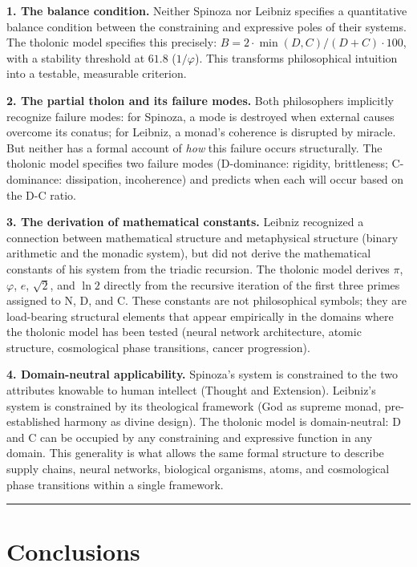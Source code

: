 \documentclass[12pt]{article}
\begin{document}
\textbf{1. The balance condition.} Neither Spinoza nor Leibniz specifies
a quantitative balance condition between the constraining and expressive
poles of their systems. The tholonic model specifies this precisely:
\(B = 2 \cdot \min(D,C)/(D+C) \cdot 100\), with a stability threshold at
\(61.8\) (\(1/\varphi\)). This transforms philosophical intuition into a
testable, measurable criterion.

\textbf{2. The partial tholon and its failure modes.} Both philosophers
implicitly recognize failure modes: for Spinoza, a mode is destroyed
when external causes overcome its conatus; for Leibniz, a monad's
coherence is disrupted by miracle. But neither has a formal account of
\emph{how} this failure occurs structurally. The tholonic model
specifies two failure modes (D-dominance: rigidity, brittleness;
C-dominance: dissipation, incoherence) and predicts when each will occur
based on the D-C ratio.

\textbf{3. The derivation of mathematical constants.} Leibniz recognized
a connection between mathematical structure and metaphysical structure
(binary arithmetic and the monadic system), but did not derive the
mathematical constants of his system from the triadic recursion. The
tholonic model derives \(\pi\), \(\varphi\), \(e\), \(\sqrt{2}\), and
\(\ln 2\) directly from the recursive iteration of the first three
primes assigned to N, D, and C. These constants are not philosophical
symbols; they are load-bearing structural elements that appear
empirically in the domains where the tholonic model has been tested
(neural network architecture, atomic structure, cosmological phase
transitions, cancer progression).

\textbf{4. Domain-neutral applicability.} Spinoza's system is
constrained to the two attributes knowable to human intellect (Thought
and Extension). Leibniz's system is constrained by its theological
framework (God as supreme monad, pre-established harmony as divine
design). The tholonic model is domain-neutral: D and C can be occupied
by any constraining and expressive function in any domain. This
generality is what allows the same formal structure to describe supply
chains, neural networks, biological organisms, atoms, and cosmological
phase transitions within a single framework.

\begin{center}\rule{0.5\linewidth}{0.5pt}\end{center}

\section{Conclusions}\label{conclusions}
\end{document}
